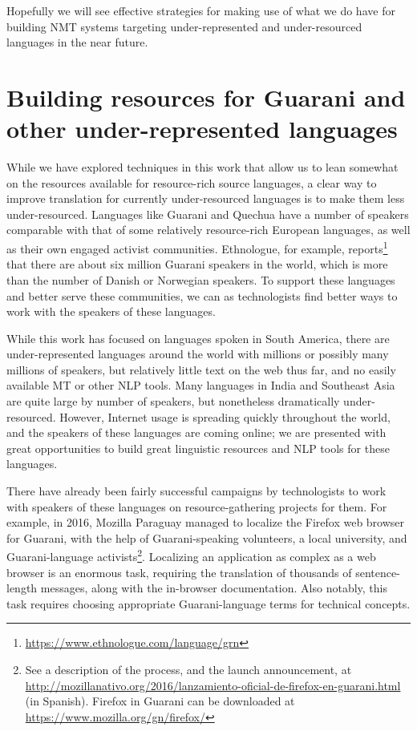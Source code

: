 Hopefully we will see effective strategies for making use of what we do have
for building NMT systems targeting under-represented and under-resourced
languages in the near future.

\section{Building resources for Guarani and other under-represented languages}
\label{sec:crowdsourcing}

While we have explored techniques in this work that allow us to lean
somewhat on the resources available for resource-rich source
languages, a clear way to improve translation for currently under-resourced
languages is to make them less under-resourced. Languages like Guarani and
Quechua have a number of speakers comparable with that of some relatively
resource-rich European languages, as well as their own engaged activist
communities. Ethnologue, for example,
reports\footnote{\url{https://www.ethnologue.com/language/grn}} that there are
about six million Guarani speakers in the world, which is more than the number
of Danish or Norwegian speakers. To support these languages and better serve
these communities, we can as technologists find better ways to work with the
speakers of these languages.

While this work has focused on languages spoken in South America, there are
under-represented languages around the world with millions or possibly many
millions of speakers, but relatively little text on the web thus far, and no
easily available MT or other NLP tools. Many languages in India and Southeast
Asia are quite large by number of speakers, but nonetheless dramatically
under-resourced. However, Internet usage is spreading quickly throughout the
world, and the speakers of these languages are coming online; we are presented
with great opportunities to build great linguistic resources and NLP tools for
these languages.

There have already been fairly successful campaigns by technologists to work
with speakers of these languages on resource-gathering projects for them. For
example, in 2016, Mozilla Paraguay managed to localize the Firefox web browser
for Guarani, with the help of Guarani-speaking volunteers, a local university,
and Guarani-language activists\footnote{See a description of the process, and
the launch announcement, at
\url{http://mozillanativo.org/2016/lanzamiento-oficial-de-firefox-en-guarani.html}
(in Spanish). Firefox in Guarani can be downloaded at
\url{https://www.mozilla.org/gn/firefox/}}. Localizing an application as
complex as a web browser is an enormous task, requiring the translation of
thousands of sentence-length messages, along with the in-browser
documentation. Also notably, this task requires choosing appropriate
Guarani-language terms for technical concepts.

